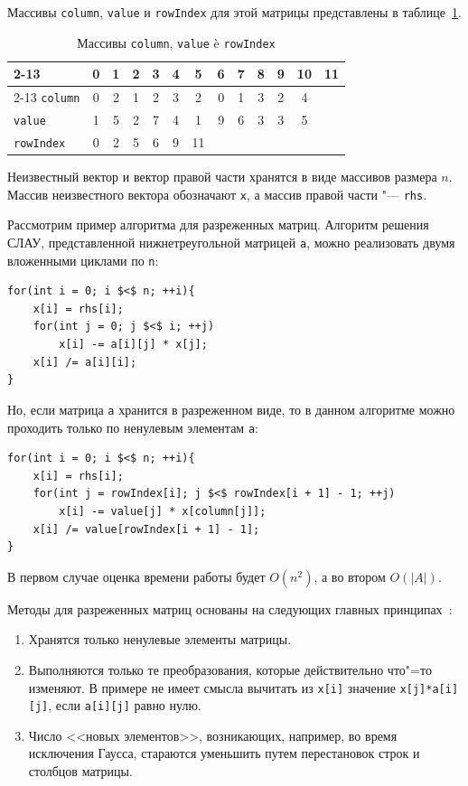 \documentclass[bachelor, och, coursework, times]{SCWorks}
\begin{document}
Массивы \verb"column", \verb"value" и \verb"rowIndex" для этой матрицы представлены в таблице~\ref{tab:mat-arrays}.
\begin{table}[ht]\small
	\caption{Массивы \texttt{column}, \texttt{value} è \texttt{rowIndex}}\label{tab:mat-arrays}
	\begin{tabular}{|l|c|c|c|c|c|c|c|c|c|c|c|c|} \cline{2-13}
		\multicolumn{1}{c|}{} & 0 & 1 & 2 & 3 & 4 & 5 & 6 & 7 & 8 & 9 & 10 & 11 \\ \cline{2-13}\hline
		\verb"column" & 0 & 2 & 1 & 2 & 3 & 2 & 0 & 1 & 3 & 2 & 4 &  \\ \hline\hline
		\verb"value" & 1 & 5 & 2 & 7 & 4 & 1 & 9 & 6 & 3 & 3 & 5 &  \\ \hline\hline
		\verb"rowIndex" & 0 & 2 & 5 & 6 & 9 & 11 &  &  &  &  &  &  \\ \hline
	\end{tabular}
\end{table}

Неизвестный вектор и вектор правой части хранятся в виде массивов размера $n$. Массив неизвестного вектора обозначают \verb"x", а массив правой части "--- \verb"rhs".

Рассмотрим пример алгоритма для разреженных матриц. Алгоритм решения СЛАУ, представленной нижнетреугольной матрицей \verb"a", можно реализовать двумя вложенными циклами по \verb"n":
\begin{verbatim}
for(int i = 0; i $<$ n; ++i){
    x[i] = rhs[i];
    for(int j = 0; j $<$ i; ++j)
        x[i] -= a[i][j] * x[j];
    x[i] /= a[i][i];
} 
\end{verbatim}

Но, если матрица \verb"a" хранится в разреженном виде, то в данном алгоритме можно проходить только по ненулевым элементам \verb"a":
\begin{verbatim}
for(int i = 0; i $<$ n; ++i){
    x[i] = rhs[i];
    for(int j = rowIndex[i]; j $<$ rowIndex[i + 1] - 1; ++j)
        x[i] -= value[j] * x[column[j]];
    x[i] /= value[rowIndex[i + 1] - 1];
}
\end{verbatim}

В первом случае оценка времени работы будет $O(n^{2})$, а во втором $O(|A|)$.

Методы для разреженных матриц основаны на следующих главных принципах~\cite{matrix_87}:

\begin{enumerate}
    \item  Хранятся только ненулевые элементы матрицы.
    \item  Выполняются только те преобразования, которые действительно что"=то изменяют. В примере не имеет смысла вычитать из \verb"x[i]" значение \verb"x[j]*a[i][j]", если \verb"a[i][j]" равно нулю.
    \item  Число <<новых элементов>>, возникающих, например, во время исключения Гаусса, стараются уменьшить путем перестановок строк и столбцов матрицы.
\end{enumerate}
\end{document}
